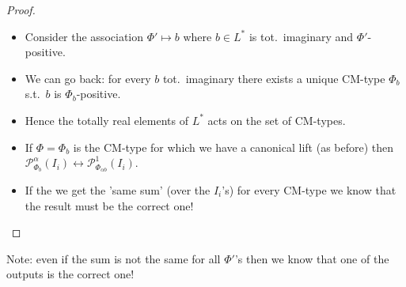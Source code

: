\documentclass[usenames,dvipsnames]{beamer}
\newcommand{\Palpha}[2]{\mathcal{P}^{\alpha}_{{#1}}({#2})}
\newcommand{\Pone}[2]{\mathcal{P}^{1}_{{#1}}({#2})}
\begin{document}
\begin{frame}{ }
    \begin{proof}
    \begin{itemize}
    \item Consider the association $\Phi'\mapsto b$ where $b\in L^*$ is tot.~imaginary and $\Phi'$-positive.
    \item We can go back: for every $b$ tot.~imaginary there exists a unique CM-type $\Phi_b$ s.t.~$b$ is $\Phi_b$-positive.
    \item Hence the totally real elements of $L^*$ acts on the set of CM-types.
    \item If $\Phi=\Phi_{b}$ is the CM-type for which we have a canonical lift (as before)
        then $\Palpha{\Phi_b}{I_i} \longleftrightarrow \Pone{\Phi_{\alpha b}}{I_i}$.
    \item If the we get the 'same sum' (over the $I_i$'s) for every CM-type we know that the result must be the correct one! 
    \end{itemize}
    \end{proof} 
    Note: even if the sum is not the same for all $\Phi'$'s then we know that one of the outputs is the correct one!
\end{frame}
\end{document}
